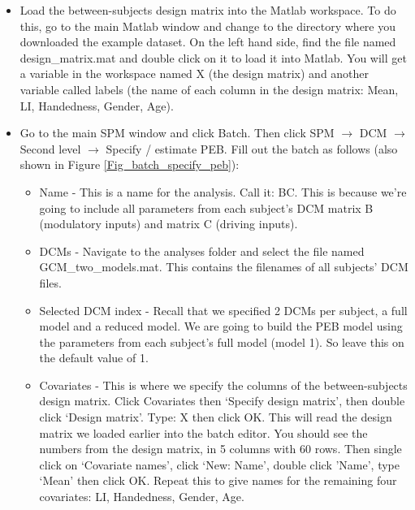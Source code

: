 \documentclass{article}
\begin{document}
\begin{itemize}
    \item Load the between-subjects design matrix into the Matlab workspace. To do this, go to the main Matlab window and change to the directory where you downloaded the example dataset. On the left hand side, find the file named design\_matrix.mat and double click on it to load it into Matlab. You will get a variable in the workspace named X (the design matrix) and another variable called labels (the name of each column in the design matrix: Mean, LI, Handedness, Gender, Age). 
    \item Go to the main SPM window and click Batch. Then click SPM $\rightarrow$ DCM $\rightarrow$ Second level $\rightarrow$ Specify / estimate PEB. Fill out the batch as follows (also shown in Figure \ref{Fig_batch_specify_peb}):
    
    \begin{itemize}
        \item Name - This is a name for the analysis. Call it: BC. This is because we're going to include all parameters from each subject's DCM matrix B (modulatory inputs) and matrix C (driving inputs).
        
        \item DCMs - Navigate to the analyses folder and select the file named  GCM\_two\_models.mat. This contains the filenames of all subjects' DCM files.
        
        \item Selected DCM index - Recall that we specified 2 DCMs per subject, a full model and a reduced model. We are going to build the PEB model using the parameters from each subject's full model (model 1). So leave this on the default value of 1.
        
        \item Covariates - This is where we specify the columns of the  between-subjects design matrix. Click Covariates then `Specify design matrix', then double click `Design matrix'. Type: X then click OK. This will read the design matrix we loaded earlier into the batch editor. You should see the numbers from the design matrix, in 5 columns with 60 rows. Then single click on `Covariate names', click `New: Name', double click 'Name', type `Mean' then click OK.  Repeat this to give names for the remaining four covariates: LI, Handedness, Gender, Age.
        

\end{itemize}
\end{itemize}
\end{document}
